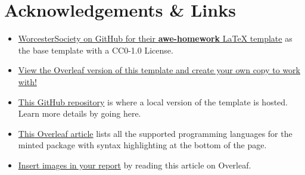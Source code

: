 \documentclass[11pt]{awe-homework}
\begin{document}
\section*{Acknowledgements \& Links}

\begin{itemize}
    \item \href{https://github.com/WorcesterSociety/HomeworkTemplate}{WorcesterSociety on GitHub for their \textbf{awe-homework} LaTeX template} as the base template with a CC0-1.0 License.
    \item \href{https://www.overleaf.com/read/nghcfhgrsztp}{View the Overleaf version of this template and create your own copy to work with!}
    \item \href{https://github.com/rzmk/report-template}{This GitHub repository} is where a local version of the template is hosted. Learn more details by going here.
    \item \href{https://www.overleaf.com/learn/latex/Code_Highlighting_with_minted}{This Overleaf article} lists all the supported programming languages for the minted package with syntax highlighting at the bottom of the page.
    \item \href{https://www.overleaf.com/learn/latex/Inserting_Images}{Insert images in your report} by reading this article on Overleaf.
\end{itemize}
\end{document}
